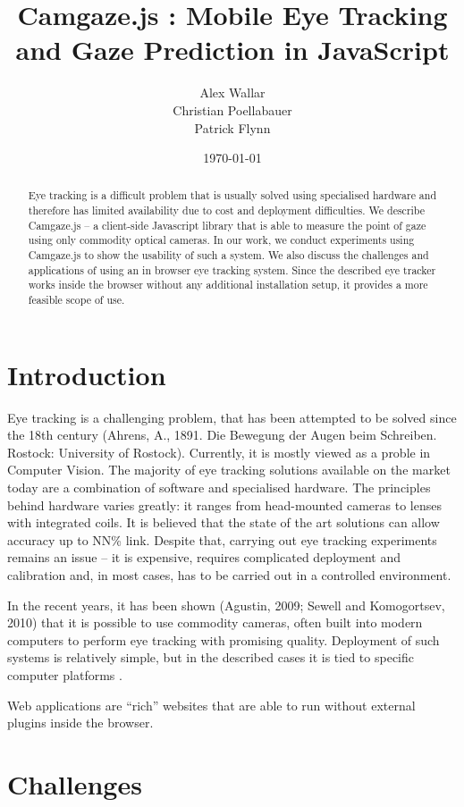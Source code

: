 \documentclass[annual]{acmsiggraph}
\title{Camgaze.js : Mobile Eye Tracking and Gaze Prediction in JavaScript}
\author{Alex Wallar \\ Christian Poellabauer \\ Patrick Flynn}
\date{\today}
\begin{document}
\maketitle

\begin{abstract}
Eye tracking is a difficult problem that is usually solved using specialised
hardware and therefore has limited availability due to cost and deployment
difficulties. We describe Camgaze.js – a client-side Javascript library that
is able to measure the point of gaze using only commodity optical cameras.
In our work, we conduct experiments using Camgaze.js to show the usability
of such a system. We also discuss the challenges and applications of using
an in browser eye tracking system. Since the described eye tracker works
inside the browser without any additional installation setup, it provides
a more feasible scope of use.
\end{abstract}

\section{Introduction}

Eye tracking is a challenging problem, that has been attempted to be solved
since the 18th century (Ahrens, A., 1891. Die Bewegung der Augen beim Schreiben.
Rostock: University of Rostock). Currently, it is mostly viewed as a proble
in Computer Vision.
The majority of eye tracking solutions available on the market today are a combination
of software and specialised hardware. The principles behind hardware varies greatly:
it ranges from head-mounted cameras to lenses with integrated coils. It is believed
that the state of the art solutions can allow accuracy up to NN\% {link}. Despite that,
carrying out eye tracking experiments remains an issue – it is expensive, requires
complicated deployment and calibration and, in most cases, has to be carried out
in a controlled environment.

In the recent years, it has been shown (Agustin, 2009; Sewell and Komogortsev, 2010)
that it is possible to use commodity cameras, often built into modern computers to
perform eye tracking with promising quality. Deployment of such systems is relatively
simple, but in the described cases it is tied to specific computer platforms \cite{holland2012eye}.

Web applications are “rich” websites that are able to run without external plugins inside the browser. 

\section{Challenges}
\end{document}
